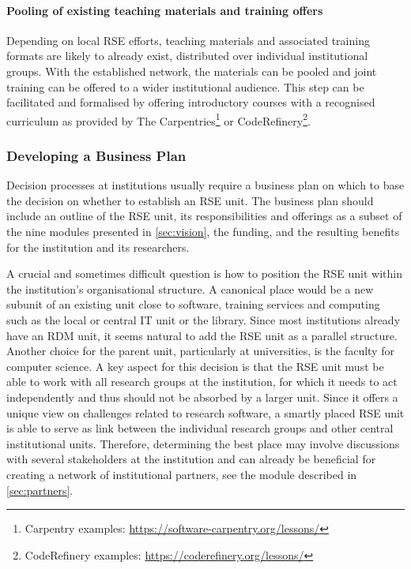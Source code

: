\documentclass[10pt,letterpaper]{article}
\begin{document}
\paragraph{Pooling of existing teaching materials and training offers}
Depending on local RSE efforts, teaching materials and associated training formats are likely to already exist, distributed over individual institutional groups.
With the established network, the materials can be pooled and joint training can be offered to a wider institutional audience.
This step can be facilitated and formalised by offering introductory courses with a recognised curriculum as provided by The Carpentries\footnote{Carpentry examples: \url{https://software-carpentry.org/lessons/}}
or CodeRefinery\footnote{CodeRefinery examples: \url{https://coderefinery.org/lessons/}}.

\subsubsection*{Developing a Business Plan}
Decision processes at institutions usually require a business plan on which to base the decision on whether to establish an RSE unit.
The business plan should include an outline of the RSE unit, its responsibilities and offerings as a subset of the nine modules presented in \autoref{sec:vision}, the funding, and the resulting benefits for the institution and its researchers.

A crucial and sometimes difficult question is how to position the RSE unit within the institution’s organisational structure.
A canonical place would be a new subunit of an existing unit close to software, training services and computing such as the local or central IT unit or the library.
Since most institutions already have an RDM unit, it seems natural to add the RSE unit as a parallel structure.
Another choice for the parent unit, particularly at universities, is the faculty for computer science.
A key aspect for this decision is that the RSE unit must be able to work with all research groups at the institution, for which it needs to act independently and thus should not be absorbed by a larger unit.
Since it offers a unique view on challenges related to research software, a smartly placed RSE unit is able to serve as link between the individual research groups and other central institutional units.
Therefore, determining the best place may involve discussions with several stakeholders at the institution and can already be beneficial for creating a network of institutional partners, see the module described in \autoref{sec:partners}.
\end{document}
